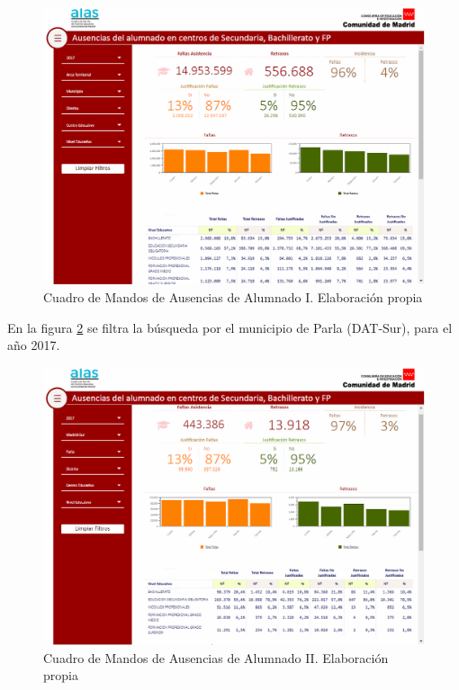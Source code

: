 \begin{subappendices}
\begin{figure}[htb]
	\centering
	\caption{Cuadro de Mandos de Ausencias de Alumnado I. Elaboración propia}
	\label{fig:FaltasAsistenciaI}
	\includegraphics[width=1\textwidth]{recursos/FaltasAsistenciaI}
\end{figure}
\FloatBarrier

En la figura \ref{fig:FaltasAsistenciaII} se filtra la búsqueda por el municipio de Parla (DAT-Sur), para el año 2017.

\begin{figure}[htb]
	\centering
	\caption{Cuadro de Mandos de Ausencias de Alumnado II. Elaboración propia}
	\label{fig:FaltasAsistenciaII}
	\includegraphics[width=1\textwidth]{recursos/FaltasAsistenciaII}
\end{figure}
\FloatBarrier


\end{subappendices}
